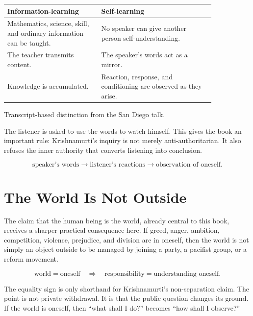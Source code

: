 \documentclass[11pt,oneside]{book}
\begin{document}
\begin{table}
\centering
\begin{tabular}{|p{0.38\linewidth}|p{0.46\linewidth}|}
\hline
\textbf{Information-learning} & \textbf{Self-learning}\\
\hline
Mathematics, science, skill, and ordinary information can be taught. & No speaker can give another person self-understanding.\\
\hline
The teacher transmits content. & The speaker's words act as a mirror.\\
\hline
Knowledge is accumulated. & Reaction, response, and conditioning are observed as they arise.\\
\hline
\end{tabular}

Transcript-based distinction from the San Diego talk.
\end{table}

The listener is asked to use the words to watch himself. This gives the book an important rule: Krishnamurti's inquiry is not merely anti-authoritarian. It also refuses the inner authority that converts listening into conclusion.

\begin{equation}
\text{speaker's words}
\longrightarrow
\text{listener's reactions}
\longrightarrow
\text{observation of oneself}.
\end{equation}

\section{The World Is Not Outside}

The claim that the human being is the world, already central to this book, receives a sharper practical consequence here. If greed, anger, ambition, competition, violence, prejudice, and division are in oneself, then the world is not simply an object outside to be managed by joining a party, a pacifist group, or a reform movement.

\begin{equation}
\text{world} = \text{oneself}
\quad\Longrightarrow\quad
\text{responsibility} = \text{understanding oneself}.
\end{equation}

The equality sign is only shorthand for Krishnamurti's non-separation claim. The point is not private withdrawal. It is that the public question changes its ground. If the world is oneself, then ``what shall I do?'' becomes ``how shall I observe?''
\end{document}
